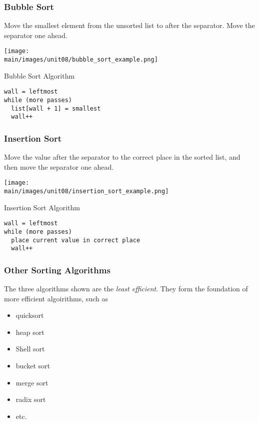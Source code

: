 \documentclass[\main/notes.tex]{subfiles}
\begin{document}
				\subsubsection{Bubble Sort}
					Move the smallest element from the unsorted list to after the separator. Move the separator one ahead.
					\begin{center}
						\texttt{[image: \\main/images/unit08/bubble\_sort\_example.png]}
					\end{center}
					\begin{sidenote}{Bubble Sort Algorithm}
						\begin{lstlisting}
wall = leftmost
while (more passes)
  list[wall + 1] = smallest
  wall++
						\end{lstlisting}
					\end{sidenote}
				\subsubsection{Insertion Sort}
					Move the value after the separator to the correct place in the sorted list, and then move the separator one ahead.
					\begin{center}
						\texttt{[image: \\main/images/unit08/insertion\_sort\_example.png]}
					\end{center}
					\begin{sidenote}{Insertion Sort Algorithm}
						\begin{lstlisting}
wall = leftmost
while (more passes)
  place current value in correct place
  wall++
						\end{lstlisting}
					\end{sidenote}
				\pagebreak
				\subsubsection{Other Sorting Algorithms}
					The three algorithms shown are the \emph{least efficient}. They form the foundation of more efficient algoirithms, such as
					\begin{itemize}[nosep]
						\item quicksort
						\item heap sort
						\item Shell sort
						\item bucket sort
						\item merge sort
						\item radix sort
						\item etc.
					\end{itemize}
\end{document}
